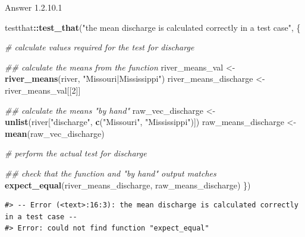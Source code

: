 \documentclass[
]{book}
\newenvironment{Shaded}{\begin{snugshade}}{\end{snugshade}}
\newcommand{\CommentTok}[1]{\textcolor[rgb]{0.56,0.35,0.01}{\textit{#1}}}
\newcommand{\DecValTok}[1]{\textcolor[rgb]{0.00,0.00,0.81}{#1}}
\newcommand{\KeywordTok}[1]{\textcolor[rgb]{0.13,0.29,0.53}{\textbf{#1}}}
\newcommand{\NormalTok}[1]{#1}
\newcommand{\OperatorTok}[1]{\textcolor[rgb]{0.81,0.36,0.00}{\textbf{#1}}}
\newcommand{\StringTok}[1]{\textcolor[rgb]{0.31,0.60,0.02}{#1}}
\begin{document}
Answer 1.2.10.1

\begin{Shaded}
\begin{Highlighting}[]
\NormalTok{testthat}\OperatorTok{::}\KeywordTok{test_that}\NormalTok{(}\StringTok{"the mean discharge is calculated correctly in a test case"}\NormalTok{, \{}
  
  \CommentTok{# calculate values required for the test for discharge}

  \CommentTok{## calculate the means from the function}
\NormalTok{  river_means_val <-}\StringTok{ }\KeywordTok{river_means}\NormalTok{(river, }\StringTok{"Missouri|Mississippi"}\NormalTok{)}
\NormalTok{  river_means_discharge <-}\StringTok{ }\NormalTok{river_means_val[[}\DecValTok{2}\NormalTok{]]}

  \CommentTok{## calculate the means "by hand"}
\NormalTok{  raw_vec_discharge <-}\StringTok{ }\KeywordTok{unlist}\NormalTok{(river[}\StringTok{"discharge"}\NormalTok{, }\KeywordTok{c}\NormalTok{(}\StringTok{"Missouri"}\NormalTok{, }\StringTok{"Mississippi"}\NormalTok{)])}
\NormalTok{  raw_means_discharge <-}\StringTok{ }\KeywordTok{mean}\NormalTok{(raw_vec_discharge)}
  
  \CommentTok{# perform the actual test for discharge}

  \CommentTok{## check that the function and "by hand" output matches}
  \KeywordTok{expect_equal}\NormalTok{(river_means_discharge, raw_means_discharge)}
\NormalTok{\})}
\end{Highlighting}
\end{Shaded}

\begin{verbatim}
#> -- Error (<text>:16:3): the mean discharge is calculated correctly in a test case --
#> Error: could not find function "expect_equal"
\end{verbatim}
\end{document}
